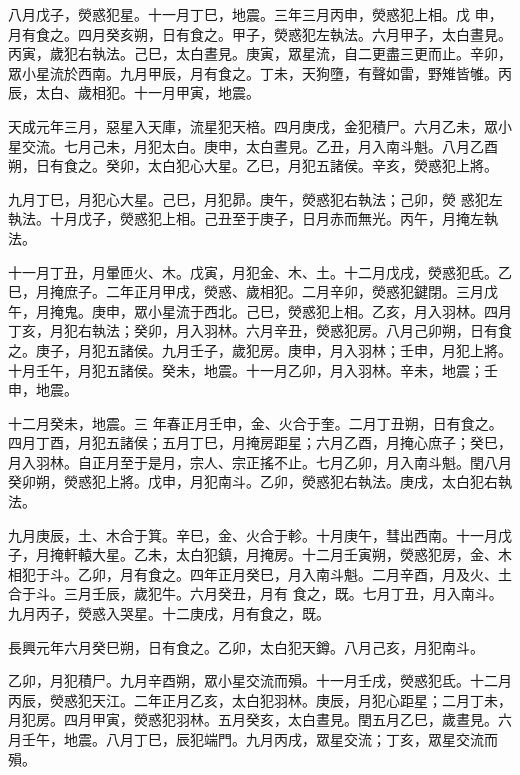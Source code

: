 \begin{pinyinscope}
 八月戊子，熒惑犯星。十一月丁巳，地震。三年三月丙申，熒惑犯上相。戊
 申，月有食之。四月癸亥朔，日有食之。甲子，熒惑犯左執法。六月甲子，太白晝見。丙寅，歲犯右執法。己巳，太白晝見。庚寅，眾星流，自二更盡三更而止。辛卯，眾小星流於西南。九月甲辰，月有食之。丁未，天狗墮，有聲如雷，野雉皆雊。丙辰，太白、歲相犯。十一月甲寅，地震。



 天成元年三月，惡星入天庫，流星犯天棓。四月庚戌，金犯積尸。六月乙未，眾小星交流。七月己未，月犯太白。庚申，太白晝見。乙丑，月入南斗魁。八月乙酉朔，日有食之。癸卯，太白犯心大星。乙巳，月犯五諸侯。辛亥，熒惑犯上將。



 九月丁巳，月犯心大星。己巳，月犯昴。庚午，熒惑犯右執法；己卯，熒
 惑犯左執法。十月戊子，熒惑犯上相。己丑至于庚子，日月赤而無光。丙午，月掩左執法。



 十一月丁丑，月暈匝火、木。戊寅，月犯金、木、土。十二月戊戌，熒惑犯氐。乙巳，月掩庶子。二年正月甲戌，熒惑、歲相犯。二月辛卯，熒惑犯鍵閉。三月戊午，月掩鬼。庚申，眾小星流于西北。己巳，熒惑犯上相。乙亥，月入羽林。四月丁亥，月犯右執法；癸卯，月入羽林。六月辛丑，熒惑犯房。八月己卯朔，日有食之。庚子，月犯五諸侯。九月壬子，歲犯房。庚申，月入羽林；壬申，月犯上將。十月壬午，月犯五諸侯。癸未，地震。十一月乙卯，月入羽林。辛未，地震；壬申，地震。



 十二月癸未，地震。三
 年春正月壬申，金、火合于奎。二月丁丑朔，日有食之。四月丁酉，月犯五諸侯；五月丁巳，月掩房距星；六月乙酉，月掩心庶子；癸巳，月入羽林。自正月至于是月，宗人、宗正搖不止。七月乙卯，月入南斗魁。閏八月癸卯朔，熒惑犯上將。戊申，月犯南斗。乙卯，熒惑犯右執法。庚戌，太白犯右執法。



 九月庚辰，土、木合于箕。辛巳，金、火合于軫。十月庚午，彗出西南。十一月戊子，月掩軒轅大星。乙未，太白犯鎮，月掩房。十二月壬寅朔，熒惑犯房，金、木相犯于斗。乙卯，月有食之。四年正月癸巳，月入南斗魁。二月辛酉，月及火、土合于斗。三月壬辰，歲犯牛。六月癸丑，月有
 食之，既。七月丁丑，月入南斗。九月丙子，熒惑入哭星。十二庚戌，月有食之，既。



 長興元年六月癸巳朔，日有食之。乙卯，太白犯天鐏。八月己亥，月犯南斗。



 乙卯，月犯積尸。九月辛酉朔，眾小星交流而殞。十一月壬戌，熒惑犯氐。十二月丙辰，熒惑犯天江。二年正月乙亥，太白犯羽林。庚辰，月犯心距星；二月丁未，月犯房。四月甲寅，熒惑犯羽林。五月癸亥，太白晝見。閏五月乙巳，歲晝見。六月壬午，地震。八月丁巳，辰犯端門。九月丙戌，眾星交流；丁亥，眾星交流而殞。




\end{pinyinscope}
